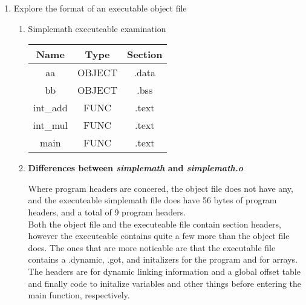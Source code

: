 \documentclass{article}
\begin{document}
\begin {enumerate}
\begin {enumerate}
			The variable \underline{cc} is not in the symbol table because it is declared inside the function main, and thus will only be used in the main function. \\
			The two functions \underline{int\_mul} and \underline{int\_add} are in the symbol table because they are functions that the linker will need to find, in order to resolve references.\\
			This is the same reason that the function main and printf are included in the symbol table.\\
			If a symbols scope is outside of the file, or references something outside of the file, then it's symbol must be on the symbol table, otherwise the linker will not be able to find it. This is essentially why the symbol \underline{cc} is not on the symbol table, because its scope is only within \underline{main} .\\
		\end{enumerate}
		\\
		\\
		\\
	\item  Explore the format of an executable object file
		\begin {enumerate}
			\item Simplemath executeable examination\\
			\begin{center}
				\begin{tabular}{|c|c|c|}
					\hline{}
					Name & Type & Section \\
					\hline{}
					aa & OBJECT & .data 	\\
					bb & OBJECT & .bss  	\\
					int\_add & FUNC & .text	\\
					int\_mul & FUNC & .text	\\
					main & FUNC & .text		\\
				\end{tabular}
			\end{center}
			\item \textbf{Differences between \emph{simplemath} and \emph{simplemath.o}}
			\\
			\raggedright{
				Where program headers are concered, the object file does not have any, and the executeable simplemath file does have 56 bytes of program headers, and a total of 9 program headers. \\
				Both the object file and the executeable file contain section headers, however the executeable contains quite a few more than the object file does. The ones that are more noticable are that the executable file contains a .dynamic, .got, and initalizers for the program and for arrays. The headers are for dynamic linking information and a global offset table and finally code to initalize variables and other things before entering the main function, respectively.\\
}
\end{enumerate}
\end{enumerate}
\end{document}

